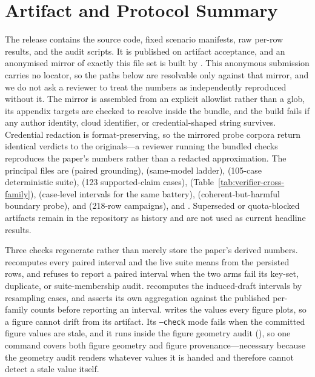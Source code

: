 \appendices

\section{Artifact and Protocol Summary}
\label{app:artifacts}
The release contains the source code, fixed scenario manifests, raw per-row
results, and the audit scripts. It is published on artifact acceptance, and an
anonymised mirror of exactly this file set is built by
. This anonymous submission carries no
locator, so the paths below are resolvable only against that mirror, and we do
not ask a reviewer to treat the numbers as independently reproduced without it.
The mirror is assembled from an explicit allowlist rather than a glob, its
appendix targets are checked to resolve inside the bundle, and the build fails
if any author identity, cloud identifier, or credential-shaped string survives.
Credential redaction is format-preserving, so the mirrored probe corpora return
identical verdicts to the originals---a reviewer running the bundled checks
reproduces the paper's numbers rather than a redacted approximation. The
principal files are
 (paired grounding),
 (same-model ladder),
 (105-case deterministic suite),
 (123 supported-claim cases),
 (Table~\ref{tab:verifier-cross-family}),
 (case-level intervals for the same battery),
 (coherent-but-harmful boundary probe),
 and
 (218-row campaigns), and
. Superseded or quota-blocked
artifacts remain in the repository as history and are not used as current
headline results.

Three checks regenerate rather than merely store the paper's derived numbers.
 recomputes every paired interval and the live
suite means from the persisted rows, and refuses to report a paired interval
when the two arms fail its key-set, duplicate, or suite-membership audit.
 recomputes the induced-draft
intervals by resampling cases, and asserts its own aggregation against the
published per-family counts before reporting an interval.
 writes the values every figure plots, so a
figure cannot drift from its artifact. Its \texttt{--check} mode fails when the
committed figure values are stale, and it runs inside the figure geometry audit
(), so one command covers both figure
geometry and figure provenance---necessary because the geometry audit renders
whatever values it is handed and therefore cannot detect a stale value itself.

